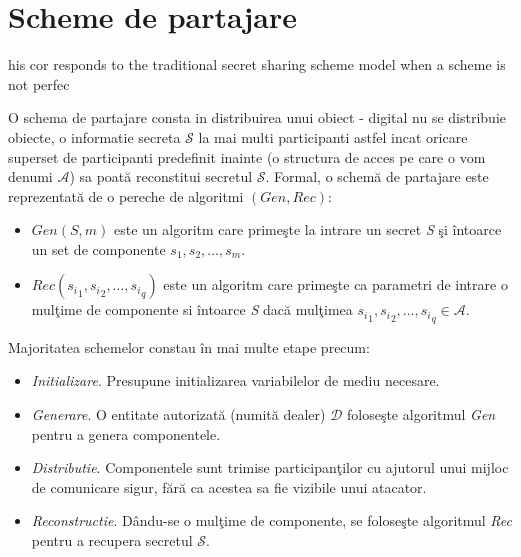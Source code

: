 \documentclass{llncs}
\newcommand{\todo}[1]{{\color{red}{TODO #1}}}
\begin{document}
\section{Scheme de partajare}his cor
responds to the traditional
secret sharing scheme model when a scheme is not perfec
\label{sec:encryption}

\todo{Diacritice!}

O schema de partajare consta in distribuirea unui obiect - digital nu se distribuie obiecte, o informatie secreta $\mathcal{S}$ la mai multi participanti astfel incat oricare superset de participanti predefinit inainte (o structura de acces pe care o vom denumi $\mathcal{A}$) sa poat\u{a} reconstitui secretul $\mathcal{S}$.
Formal, o schem\u{a} de partajare este reprezentat\u{a} de o pereche de algoritmi \textbf{$(Gen, Rec)$}:
\begin{itemize}
	\item \textit{$Gen(S, m)$} este un algoritm care prime\c{s}te la intrare un secret \textit{S} \c{s}i \^{i}ntoarce un set de componente ${s_1, s_2, \dots, s_m}$.
	\item \textit{$Rec({s_i}_1, {s_i}_2, \dots, {s_i}_q)$} este un algoritm care prime\c{s}te ca parametri de intrare o mul\c{t}ime de componente si \^{i}ntoarce \textit{S} dac\u{a} mul\c{t}imea ${s_i}_1, {s_i}_2, \dots, {s_i}_q \in \mathcal{A}$.
\end{itemize} 
Majoritatea schemelor constau \^{i}n mai multe etape precum:
\begin{itemize}
	\item \textit{Initializare}. Presupune initializarea variabilelor de mediu necesare.
	\item \textit{Generare}. O entitate autorizat\u{a} (numit\u{a} dealer) $\mathcal{D}$ folose\c{s}te algoritmul \textit{Gen} pentru a genera componentele.
	\item \textit{Distributie}. Componentele sunt trimise participan\c{t}ilor cu ajutorul unui mijloc de comunicare sigur, f\u{a}r\u{a} ca acestea sa fie vizibile unui atacator.
	\item \textit{Reconstructie}. D\^{a}ndu-se o mul\c{t}ime de componente, se folose\c{s}te algoritmul \textit{Rec} pentru a recupera secretul
	$\mathcal{S}$.
\end{itemize}
\end{document}
